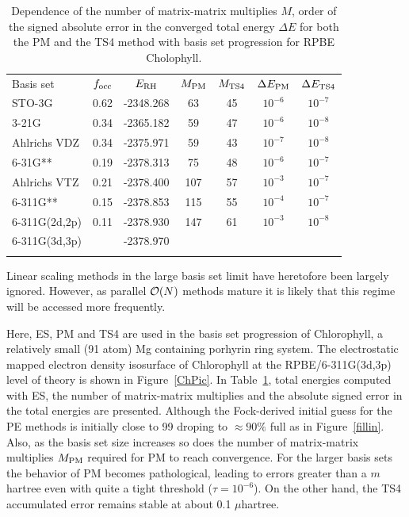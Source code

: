 \commentoutA{\documentclass[prb,aps,twocolumn,twocolumngrid,secnumarabic,superbib,hyperref]{revtex4}}
\begin{document}
\begin{table}
\caption{Dependence of the number of matrix-matrix multiplies $M$, order of the signed absolute 
error in the converged total energy $\Delta E$ for both the PM and the TS4 method with basis set 
progression for RPBE Cholophyll.}
\label{ChlorophyllConvergence}
\squeezetable
\begin{tabular}{lcccccc}
\toprule
Basis set       &  $f_{\rm occ}$ & $E_{\rm RH}$       &$M_{\rm PM}$&$M_{\rm TS4}$& $\Delta E_{\rm PM}$ & $\Delta E_{\rm TS4}$ \\
\colrule
STO-3G          &  0.62      & -2348.268  & 63      & 45       & $ 10^{-6}$   &  $ 10^{-7}$   \\ 
3-21G           &  0.34	     & -2365.182  & 59      & 47       & $ 10^{-6}$   &  $ 10^{-8}$   \\
Ahlrichs VDZ    &  0.34      & -2375.971  & 59      & 43       & $ 10^{-7}$   &  $ 10^{-8}$   \\
6-31G**         &  0.19      & -2378.313  & 75      & 48       & $ 10^{-6}$   &  $ 10^{-7}$   \\
Ahlrichs VTZ    &  0.21      & -2378.400  & 107     & 57       & $ 10^{-3}$   &  $ 10^{-7}$   \\
6-311G**        &  0.15      & -2378.853  & 115     & 55       & $ 10^{-4}$   &  $ 10^{-7}$   \\
6-311G(2d,2p)   &  0.11      & -2378.930  & 147     & 61       & $ 10^{-3}$   &  $ 10^{-8}$   \\
6-311G(3d,3p)   &            & -2378.970  &         &          &              &        \\
\botrule
\end{tabular}
\end{table}

Linear scaling methods in the large basis set limit have heretofore been largely
ignored.  However, as parallel ${\cal O}(N)$ methods mature it is likely that  this 
regime will be accessed more frequently.

Here, ES, PM and TS4 are used in the basis set progression 
of Chlorophyll, a relatively small (91 atom) Mg containing porhyrin ring system. 
The electrostatic mapped electron density isosurface of Chlorophyll at the
RPBE/6-311G(3d,3p) level of theory is shown in Figure~\ref{ChPic}. 
In Table~\ref{ChlorophyllConvergence}, total energies computed with ES, the number 
of matrix-matrix multiplies and the absolute signed error in the total energies are 
presented.  Although the Fock-derived initial guess for the PE methods is initially 
close to 99%
droping to $\approx 90\%$ full as in Figure~\ref{fillin}.  Also, as the basis set 
size increases so does the number of matrix-matrix multiplies $M_{\rm PM}$ required 
for PM to reach convergence. For the larger basis sets the behavior of PM becomes 
pathological,  leading to errors greater than a $m$hartree even with quite a tight
threshold ($\tau=10^{-6}$).  On the other hand, the TS4 accumulated error remains
stable at about 0.1 $\mu$hartree.
\end{document}
